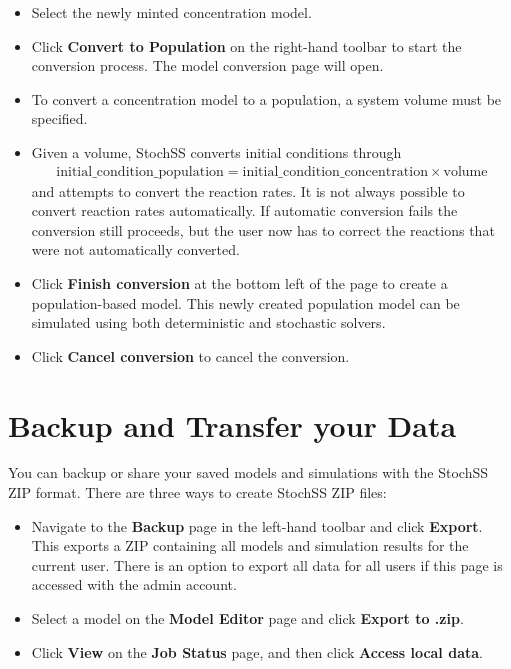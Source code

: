 \begin{itemize}
  \item Select the newly minted concentration model.
  \item Click \textbf{Convert to Population} on the right-hand toolbar to start the conversion process. The model conversion page will open.
  \item To convert a concentration model to a population, a system volume must be specified.
  \item Given a volume, StochSS converts initial conditions through 
  \begin{align}
  \mathrm{initial\_condition\_population} = \mathrm{initial\_condition\_concentration}\times\mathrm{volume}
  \end{align}
   and attempts to convert the reaction rates. It is not always possible to convert reaction rates automatically. If automatic conversion fails the conversion still proceeds, but the user now has to correct the reactions that were not automatically converted.
  \item Click \textbf{Finish conversion} at the bottom left of the page to create a population-based model. This newly created population model can be simulated using both deterministic and stochastic solvers.
  \item Click \textbf{Cancel conversion} to cancel the conversion.
\end{itemize}


\section{Backup and Transfer your Data}
You can backup or share your saved models and simulations with the StochSS ZIP format. There are three ways to create StochSS ZIP files:

\begin{itemize}
\item Navigate to the \textbf{Backup} page in the left-hand toolbar and click \textbf{Export}. This exports a ZIP containing all models and simulation results for the current user. There is an option to export all data for all users if this page is accessed with the admin account.
\item Select a model on the \textbf{Model Editor} page and click \textbf{Export to .zip}.
\item Click \textbf{View} on the \textbf{Job Status} page, and then click \textbf{Access local data}.
\end{itemize}

